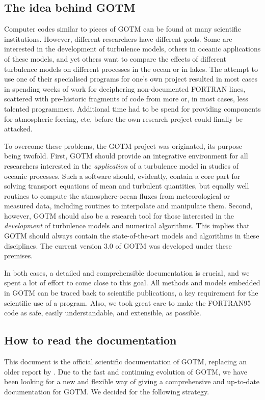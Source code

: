 \subsection{The idea behind GOTM}
Computer codes similar to pieces of GOTM can be found at many
scientific institutions. However, different researchers have different
goals. Some are interested in the development of turbulence models,
others in oceanic applications of these models, and yet others want to
compare the effects of different turbulence models on different
processes in the ocean or in lakes. The attempt to use one of their
specialised programs for one's own project resulted in most cases in
spending weeks of work for deciphering non-documented FORTRAN lines,
scattered with pre-historic fragments of code from more or, in most
cases, less talented programmers. Additional time had to be spend for
providing components for atmospheric forcing, etc, before the own
research project could finally be attacked.

To overcome these problems, the GOTM project was originated, its purpose
being twofold. First, GOTM should provide an integrative environment
for all researchers interested in the \emph{application} of a turbulence model
in studies of oceanic processes. Such a software should, evidently,
contain a core part for solving transport equations of mean and turbulent
quantities, but equally well routines to compute the atmosphere-ocean
fluxes from meteorological or measured data, including routines to interpolate
and manipulate them. Second, however, GOTM should also be a research tool for
those interested in the \emph{development} of turbulence models
and numerical algorithms. This implies that GOTM should always contain
the state-of-the-art models and algorithms in these disciplines. The current
version 3.0 of GOTM was developed under these premises.

In both cases, a detailed and comprehensible documentation is crucial,
and we spent a lot of effort to come close to this goal.  All methods
and models embedded in GOTM can be traced back to scientific
publications, a key requirement for the scientific use of a program.
Also, we took great care to make the FORTRAN95 code as safe, easily
understandable, and extensible, as possible.


\subsection{How to read the documentation}
This document is the official scientific documentation of GOTM,
replacing an older report by \cite{Burchardetal99}. Due to the fast
and continuing evolution of GOTM, we have been looking for a new and
flexible way of giving a comprehensive and up-to-date documentation
for GOTM. We decided for the following strategy.

